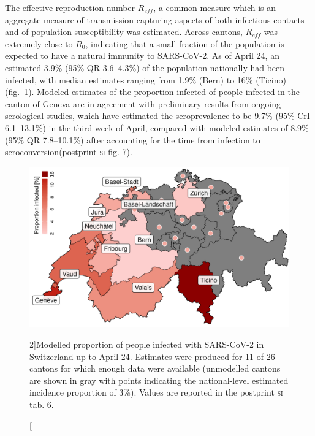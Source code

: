 The effective reproduction number $R_{eff}$, a common measure which is an aggregate measure of transmission capturing aspects of both infectious contacts and of population susceptibility was estimated. Across cantons, $R_{eff}$ was extremely close to $R_0$, indicating that a small fraction of the population is expected to have a natural immunity to SARS-CoV-2. 
As of April 24, an estimated 3.9\% (95\% QR 3.6–4.3\%) of the population nationally had been infected, with median estimates ranging from 1.9\% (Bern) to 16\% (Ticino) (fig.~\ref{fig:covid-ch-map}). 
Modeled estimates of the proportion infected of people infected in the canton of Geneva are in agreement with preliminary results from ongoing serological studies, which have estimated the seroprevalence to be 9.7\% (95\% CrI 6.1–13.1\%) in the third week of April\cite[-3\baselineskip]{Stringhini:RepeatedSeroprevalenceAntiSARSCoV2:2020}, compared with modeled estimates of 8.9\% (95\% QR 7.8–10.1\%) after accounting for the time from infection to seroconversion\cite{Wolfel:VirologicalAssessmentHospitalized:2020}(postprint \textsc{si} fig. 7).

\begin{figure}\centering
  \includegraphics[width=\textwidth]{fig_covid-switzerland-npi/FIGURE_5_mod.png}
  \caption[Modelled proportion of people infected with SARS-CoV-2 in Switzerland][2\baselineskip]{Modelled proportion of people infected with SARS-CoV-2 in Switzerland up to April 24. Estimates were produced for 11 of 26 cantons for which enough data were available (unmodelled cantons are shown in gray with points indicating the national-level estimated incidence proportion of 3\%). Values are reported in the postprint \textsc{si} tab. 6.}
  \label{fig:covid-ch-map}
\end{figure}

